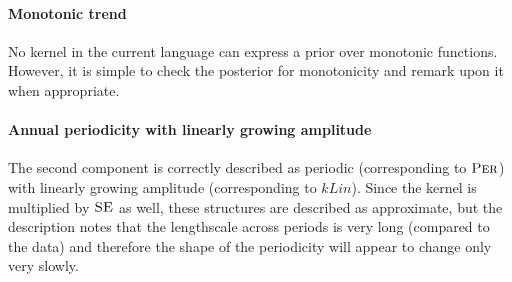 \documentclass{article}
\begin{document}
\paragraph{Monotonic trend}

No kernel in the current language can express a prior over monotonic functions.
However, it is simple to check the posterior for monotonicity and remark upon it when appropriate.

\begin{figure}[h]
\centering
{}
\end{figure}

\paragraph{Annual periodicity with linearly growing amplitude}

The second component is correctly described as periodic (corresponding to ${\textsc{Per}}$) with linearly growing amplitude (corresponding to $kLin$).
Since the kernel is multiplied by ${\textsc{SE}}$ as well, these structures are described as approximate, but the description notes that the lengthscale across periods is very long (compared to the data) and therefore the shape of the periodicity will appear to change only very slowly.
\end{document}
